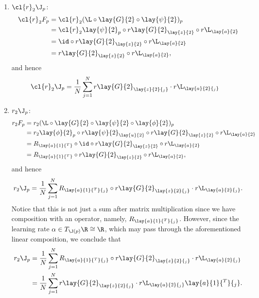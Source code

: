 \begin{enumerate}
	\item $\cl{r}_2\J_p$:
	\begin{align*}
		\cl{r}_2F_p&=\cl{r}_2(\L\circ\lay{G}{2}\circ\lay{\psi}{2})_p\\
		&=\cl{r}_2\lay{\psi}{2}_p\circ r\lay{G}{2}_{\lay{z}{2}}\circ r\L_{\lay{a}{2}}\\
		&=\id\circ r\lay{G}{2}_{\lay{z}{2}}\circ r\L_{\lay{a}{2}}\\
		&=r\lay{G}{2}_{\lay{z}{2}}\circ r\L_{\lay{a}{2}},
	\end{align*}
	and hence
	\begin{align*}
		\cl{r}_2\J_p&=\frac{1}{N}\sum_{j=1}^Nr\lay{G}{2}_{\lay{z}{2}{_j}}\cdot r\L_{\lay{a}{2}{_j}}
	\end{align*}
	
	\item $r_2\J_p$:
	\begin{align*}
		r_2F_p&=r_2(\L\circ\lay{G}{2}\circ\lay{\psi}{2}\circ\lay{\phi}{2})_p\\
		&=r_2\lay{\phi}{2}_p\circ r\lay{\psi}{2}_{\lay{u}{2}}\circ r\lay{G}{2}_{\lay{z}{2}}\circ r\L_{\lay{a}{2}}\\
		&=R_{\lay{a}{1}{^T}}\circ\id\circ r\lay{G}{2}_{\lay{z}{2}}\circ r\L_{\lay{a}{2}}\\
		&=R_{\lay{a}{1}{^T}}\circ r\lay{G}{2}_{\lay{z}{2}}\circ r\L_{\lay{a}{2}},
	\end{align*}
	and hence
	$$r_2\J_p=\frac{1}{N}\sum_{j=1}^NR_{\lay{a}{1}{^T}{_j}}\circ r\lay{G}{2}_{\lay{z}{2}{_j}}\cdot r\L_{\lay{a}{2}{_j}}.$$
	Notice that this is not just a sum after matrix multiplication since we have composition with an operator, namely, $R_{\lay{a}{1}{^T}{_j}}$.  However, since the learning rate $\alpha\in T_{\J(p)}\R\cong\R$, which may pass through the aforementioned linear composition, we conclude that
	\begin{align*}
		r_2\J_p&=\frac{1}{N}\sum_{j=1}^NR_{\lay{a}{1}{^T}{_j}}\circ r\lay{G}{2}_{\lay{z}{2}{_j}}\cdot r\L_{\lay{a}{2}{_j}}\\
		&=\frac{1}{N}\sum_{j=1}^Nr\lay{G}{2}_{\lay{z}{2}{_j}}\cdot r\L_{\lay{a}{2}{_j}}\lay{a}{1}{^T}{_j}.
	\end{align*}
	

\end{enumerate}
